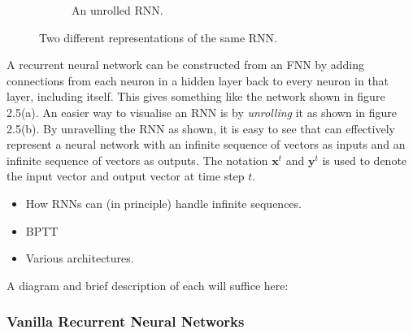 \documentclass[a4paper, 12pt]{report}
\newcommand{\tit}[1]{\textit{#1}}
\begin{document}
\begin{figure}[h]
\begin{subfigure}{0.7\linewidth}
	\caption{An unrolled RNN.}
\end{subfigure}
\caption{Two different representations of the same RNN.}
\end{figure}

A recurrent neural network can be constructed from an FNN by adding connections from each neuron in a hidden layer back to every neuron in that layer, including itself. This gives something like the network shown in figure 2.5(a). An easier way to visualise an RNN is by \tit{unrolling} it as shown in figure 2.5(b). By unravelling the RNN as shown, it is easy to see that can effectively represent a neural network with an infinite sequence of vectors as inputs and an infinite sequence of vectors as outputs. The notation $\mathbf{x}^t$ and $\mathbf{y}^t$ is used to denote the input vector and output vector at time step $t$. \\

\begin{itemize}
\item
	How RNNs can (in principle) handle infinite sequences.
\item
	BPTT
\item
	Various architectures.
\end{itemize}



A diagram and brief description of each will suffice here:
\subsubsection{Vanilla Recurrent Neural Networks}
\end{document}
